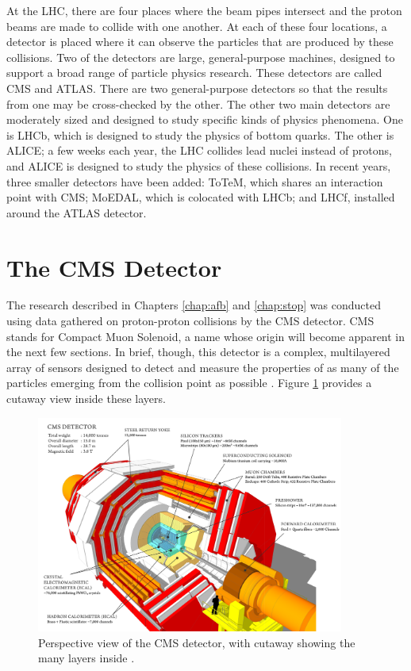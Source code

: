 At the LHC, there are four places where the beam pipes intersect and
the proton beams are made to collide with one another. At each of these
four locations, a detector is placed where it can observe the
particles that are produced by these collisions. Two of
the detectors are large, general-purpose machines, designed to support
a broad range of particle physics research. These detectors are called CMS
and ATLAS. There are two general-purpose detectors so that the results from one
may be cross-checked by the other. The other two main
detectors are moderately sized and designed to study specific kinds of physics
phenomena. One is LHCb, which is designed to study the physics of
bottom quarks. The other is ALICE; a few weeks each year, the LHC
collides lead nuclei instead of protons, and ALICE is designed to
study the physics of these collisions. In recent years, three smaller detectors have
been added: ToTeM, which shares an interaction point with CMS; MoEDAL,
which is colocated with LHCb; and LHCf, installed around the ATLAS detector.

\section{The CMS Detector}
\label{sec:cms}

The research described in Chapters \ref{chap:afb} and \ref{chap:stop}
was conducted using data gathered on proton-proton collisions by the
CMS detector. CMS stands for Compact Muon Solenoid, a name whose
origin will become apparent in the next few sections. In brief, though,
this detector is a complex, multilayered array of sensors designed to
detect and measure the properties of as many of the particles emerging
from the collision point as possible \cite{cms}. Figure
\ref{fig:cms:outside} provides a cutaway view inside these layers.

\begin{figure}[htb]
\centering
\includegraphics[width=0.9\textwidth]{figures/cms-cutaway.png}
\caption[Perspective view of the CMS detector, with cutaway showing
the many layers inside.]{Perspective view of the CMS detector, with
  cutaway showing the many layers inside \cite{websitecms}.}
\label{fig:cms:outside}
\end{figure}

